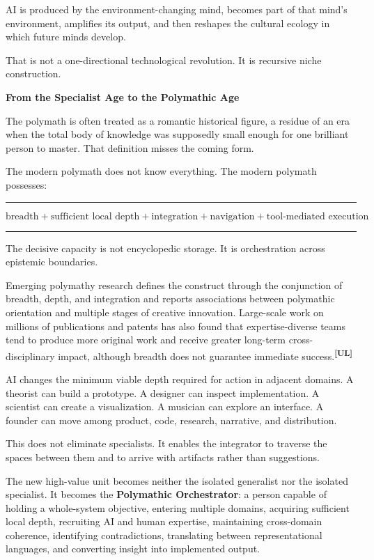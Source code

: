 \documentclass[10pt]{article}
\newcommand{\ActiveAccent}{Industrial}
\newcommand{\papersection}[2]{%
  \Needspace{8\baselineskip}
  \vspace{1.1em}
  \noindent\begin{minipage}[t]{0.12\textwidth}
    \vspace{1pt}{\sffamily\bfseries\fontsize{17}{17}\selectfont\textcolor{\ActiveAccent}{#1}}
  \end{minipage}%
  \begin{minipage}[t]{0.86\textwidth}
    {\sffamily\bfseries\fontsize{16.2}{19}\selectfont #2}\par
    \vspace{0.35em}{\color{\ActiveAccent}\rule{\linewidth}{1.15pt}}
  \end{minipage}
  \vspace{0.55em}
}
\newcommand{\term}[1]{\textsf{\bfseries\textcolor{\ActiveAccent}{#1}}}
\newcommand{\sourcecue}[1]{\textsuperscript{\sffamily\bfseries\fontsize{6.5}{7}\selectfont\textcolor{\ActiveAccent}{[#1]}}}
\newenvironment{equationpanel}{\begin{center}\begin{minipage}{0.92\linewidth}\color{\ActiveAccent}\rule{\linewidth}{0.55pt}\par\vspace{-0.25em}\color{Ink}}{\vspace{-0.10em}\par\color{\ActiveAccent}\rule{\linewidth}{0.55pt}\end{minipage}\end{center}}
\begin{document}
AI is produced by the environment-changing mind, becomes part of that mind's environment, amplifies its output, and then reshapes the cultural ecology in which future minds develop.

That is not a one-directional technological revolution. It is recursive niche construction.

\papersection{VII}{From the Specialist Age to the Polymathic Age}

The polymath is often treated as a romantic historical figure, a residue of an era when the total body of knowledge was supposedly small enough for one brilliant person to master. That definition misses the coming form.

The modern polymath does not know everything. The modern polymath possesses:

\begin{equationpanel}
\begin{equation*}
\text{breadth}+\text{sufficient local depth}+\text{integration}+\text{navigation}+\text{tool-mediated execution}
\end{equation*}
\end{equationpanel}

The decisive capacity is not encyclopedic storage. It is orchestration across epistemic boundaries.

Emerging polymathy research defines the construct through the conjunction of breadth, depth, and integration and reports associations between polymathic orientation and multiple stages of creative innovation. Large-scale work on millions of publications and patents has also found that expertise-diverse teams tend to produce more original work and receive greater long-term cross-disciplinary impact, although breadth does not guarantee immediate success.\sourcecue{UL}

AI changes the minimum viable depth required for action in adjacent domains. A theorist can build a prototype. A designer can inspect implementation. A scientist can create a visualization. A musician can explore an interface. A founder can move among product, code, research, narrative, and distribution.

This does not eliminate specialists. It enables the integrator to traverse the spaces between them and to arrive with artifacts rather than suggestions.

The new high-value unit becomes neither the isolated generalist nor the isolated specialist. It becomes the \term{Polymathic Orchestrator}: a person capable of holding a whole-system objective, entering multiple domains, acquiring sufficient local depth, recruiting AI and human expertise, maintaining cross-domain coherence, identifying contradictions, translating between representational languages, and converting insight into implemented output.
\end{document}
